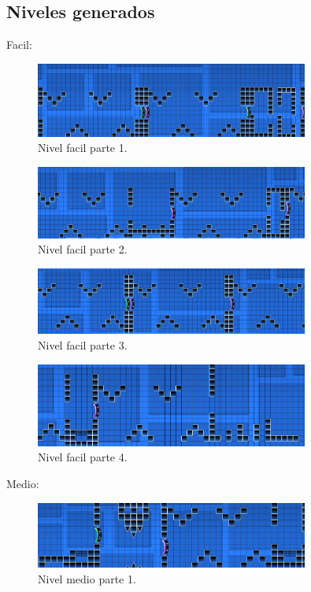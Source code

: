 \documentclass{article}
\begin{document}
\subsection{Niveles generados}
Facil: 
\begin{figure}[H]
    \centering
    \includegraphics[width=0.8\textwidth]{Niveles/Facil/E1.jpg}
    \caption{Nivel facil parte 1.}
    \label{facil_1}
\end{figure}
\begin{figure}[H]
    \centering
    \includegraphics[width=0.8\textwidth]{Niveles/Facil/E2.jpg}
    \caption{Nivel facil parte 2.}
    \label{facil_2}
\end{figure}
\begin{figure}[H]
    \centering
    \includegraphics[width=0.8\textwidth]{Niveles/Facil/E3.jpg}
    \caption{Nivel facil parte 3.}
    \label{facil_3}
\end{figure}
\begin{figure}[H]
    \centering
    \includegraphics[width=0.8\textwidth]{Niveles/Facil/E4.jpg}
    \caption{Nivel facil parte 4.}
    \label{facil_4}
\end{figure}
Medio:
\begin{figure}[H]
    \centering
    \includegraphics[width=0.8\textwidth]{Niveles/Medio/M1.jpg}
    \caption{Nivel medio parte 1.}
    \label{medio_1}
\end{figure}
\end{document}
